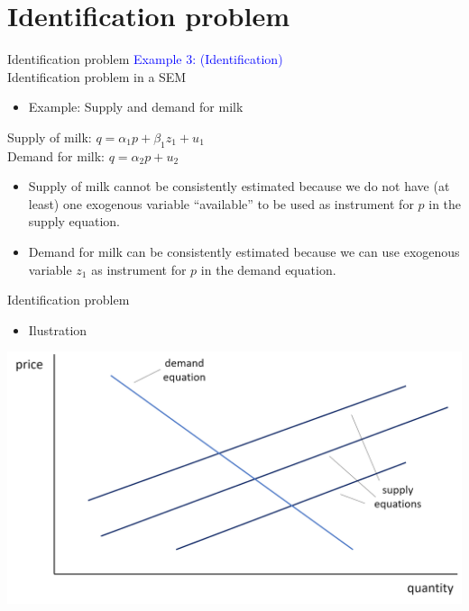 \documentclass[usenames,dvipsnames]{beamer}
\begin{document}
\section{Identification problem}
\begin{frame}{Identification problem}
\textcolor{Blue}{Example 3: (Identification)}\\
Identification problem in a SEM\\ 
\vspace{0.5cm}
\begin{itemize}
\item Example: Supply and demand for milk
\end{itemize}
\qquad Supply of milk: \qquad $q = \alpha_1 p + \beta_1 z_1 + u_1$ \\
\qquad Demand for milk: \quad $q = \alpha_2 p + u_2$ \\
\medskip
\begin{itemize}
\item Supply of milk cannot be consistently estimated because we do not have (at least) one exogenous variable  ``available'' to be used as instrument for $p$ in the supply equation.\\
\medskip
\item Demand for milk can be consistently estimated because we can use exogenous variable $z_1$  as instrument for $p$ in the demand equation.
\end{itemize}
\end{frame}
\begin{frame}{Identification problem}
\begin{itemize}
\item Ilustration 
\end{itemize}
\medskip
\includegraphics[width=\textwidth]{./img/W9_Obrazek_1}
\end{frame}
\end{document}
